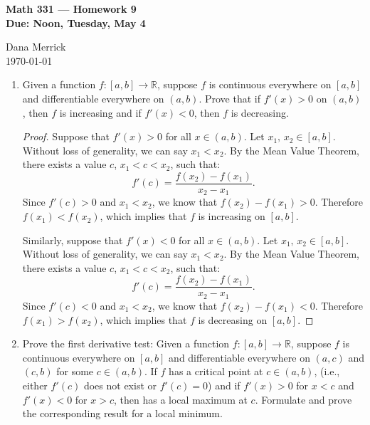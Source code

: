 \documentclass[12pt]{amsart}
\begin{document}
\thispagestyle{empty}

\begin{center}
{\bf Math 331  --- Homework 9 \\
Due:  Noon, Tuesday, May 4}
\end{center}

\bigskip

\noindent
Dana Merrick \\
\today

\bigskip


\begin{enumerate}

\setlength{\itemsep}{6pt}

\item Given a function $f : [a,b] \rightarrow \mathbb{R}$, suppose $f$ is continuous everywhere on $[a,b]$ and differentiable everywhere on $(a,b)$.  Prove that if $f'(x)>0$ on $(a,b)$, then $f$ is increasing and
  if $f'(x)<0$, then $f$ is decreasing.

\begin{proof}
Suppose that $f'(x) > 0$ for all $x\in (a,b)$. Let $x_1,\, x_2 \in [a,b]$. Without loss of generality, we can say $x_1 < x_2$. By the Mean Value Theorem, there exists a value $c$, $x_1 < c < x_2$, such that:
%
\[ f'(c) = \frac {f(x_2) - f(x_1)}{x_2 - x_1}. \]
%
Since $f'(c) > 0$ and $x_1 < x_2$, we know that $f(x_2) - f(x_1) > 0$. Therefore $f(x_1) < f(x_2)$, which implies that $f$ is increasing on $[a,b]$.

\bigskip

Similarly, suppose that $f'(x) < 0$ for all $x\in (a,b)$. Let $x_1,\, x_2 \in [a,b]$. Without loss of generality, we can say $x_1 < x_2$. By the Mean Value Theorem, there exists a value $c$, $x_1 < c < x_2$, such that:
%
\[ f'(c) = \frac {f(x_2) - f(x_1)}{x_2 - x_1}. \]
%
Since $f'(c) < 0$ and $x_1 < x_2$, we know that $f(x_2) - f(x_1) < 0$. Therefore $f(x_1) > f(x_2)$, which implies that $f$ is decreasing on $[a,b]$.
\end{proof}

\item Prove the first derivative test:  Given a function $f : [a,b] \rightarrow \mathbb{R}$, suppose $f$ is continuous everywhere on $[a,b]$ and differentiable everywhere on $(a,c)$ and $(c,b)$ for some $c\in (a,b)$.    If $f$ has a critical
  point at $c\in (a,b)$, (i.e., either $f'(c)$ does not exist or $f'(c)=0$) and if $f'(x)>0$ for $x<c$ and $f'(x)<0$ for $x>c$,  then has a local maximum at $c$.  Formulate and prove the corresponding result for a local minimum.


\end{enumerate}
\end{document}
